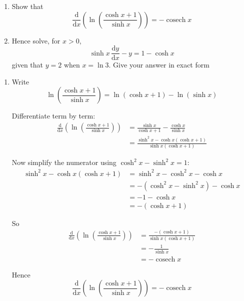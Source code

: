 \documentclass[leqno]{article}
\begin{document}
\begin{enumerate}[
  label=\textbf{\arabic*.},
  leftmargin=*,
  topsep=0pt,
  partopsep=0pt,
  parsep=0pt
]
\newpage

\questionitem

\begin{enumerate}[label=\textbf{(\alph*)}]
  \item Show that
  \[
  \frac{\mathrm{d}}{\mathrm{d}x}\!\left(\ln\!\left(\frac{\cosh x+1}{\sinh x}\right)\right)=-\operatorname{cosech} x
  \]
  \item Hence solve, for $x>0$,
  \[
  \sinh x\,\frac{\mathrm{d}y}{\mathrm{d}x}-y=1-\cosh x
  \]
  given that $y=2$ when $x=\ln 3$. Give your answer in exact form  \\
\end{enumerate}

\vspace*{10pt}

\begin{djsSolution}
\begin{enumerate}[label=\textbf{(\alph*)}]
  \item Write
\[
\ln\left(\frac{\cosh x+1}{\sinh x}\right)=\ln(\cosh x+1)-\ln(\sinh x)
\]

Differentiate term by term:
\begin{align*}
\frac{\mathrm{d}}{\mathrm{d}x}\left(\ln\left(\frac{\cosh x+1}{\sinh x}\right)\right)
&=\frac{\sinh x}{\cosh x+1}-\frac{\cosh x}{\sinh x} \\
&=\frac{\sinh^2 x-\cosh x(\cosh x+1)}{\sinh x(\cosh x+1)}
\end{align*}

Now simplify the numerator using $\cosh^2 x-\sinh^2 x=1$:
\begin{align*}
\sinh^2 x-\cosh x(\cosh x+1)
&=\sinh^2 x-\cosh^2 x-\cosh x \\
&=-(\cosh^2 x-\sinh^2 x)-\cosh x \\
&=-1-\cosh x \\
&=-(\cosh x+1)
\end{align*}

So
\begin{align*}
\frac{\mathrm{d}}{\mathrm{d}x}\left(\ln\left(\frac{\cosh x+1}{\sinh x}\right)\right)
&=\frac{-(\cosh x+1)}{\sinh x(\cosh x+1)} \\
&=-\frac{1}{\sinh x} \\
&=-\operatorname{cosech}x
\end{align*}

Hence
\[
\frac{\mathrm{d}}{\mathrm{d}x}\left(\ln\left(\frac{\cosh x+1}{\sinh x}\right)\right)=-\operatorname{cosech}x
\]


\end{enumerate}
\end{djsSolution}
\end{enumerate}
\end{document}
